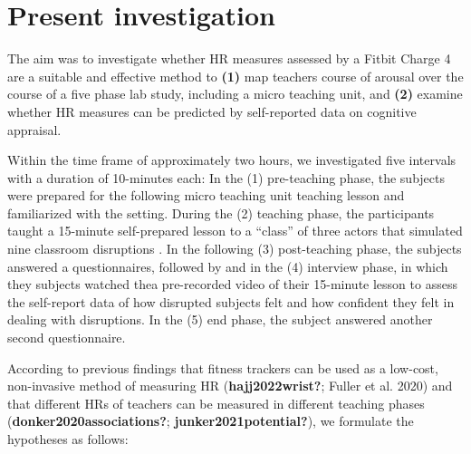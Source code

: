 \documentclass[preprint, 3p,
authoryear]{elsarticle} %
\begin{document}
\hypertarget{present-investigation}{%
\section{Present investigation}\label{present-investigation}}

The aim was to investigate whether HR measures assessed by a Fitbit
Charge 4 are a suitable and effective method to \textbf{(1)} map
teachers course of arousal over the course of a five phase lab study,
including a micro teaching unit, and \textbf{(2)} examine whether HR
measures can be predicted by self-reported data on cognitive appraisal.

Within the time frame of approximately two hours, we investigated five
intervals with a duration of 10-minutes each: In the (1) pre-teaching
phase, the subjects were prepared for the following micro teaching unit
teaching lesson and familiarized with the setting. During the (2)
teaching phase, the participants taught a 15-minute self-prepared lesson
to a ``class'' of three actors that simulated nine classroom disruptions
. In the following (3) post-teaching phase, the subjects answered a
questionnaires, followed by and in the (4) interview phase, in which
they subjects watched thea pre-recorded video of their 15-minute lesson
to assess the self-report data of how disrupted subjects felt and how
confident they felt in dealing with disruptions. In the (5) end phase,
the subject answered another second questionnaire.

According to previous findings that fitness trackers can be used as a
low-cost, non-invasive method of measuring HR (\textbf{hajj2022wrist?};
Fuller et al. 2020) and that different HRs of teachers can be measured
in different teaching phases (\textbf{donker2020associations?};
\textbf{junker2021potential?}), we formulate the hypotheses as follows:
\end{document}
